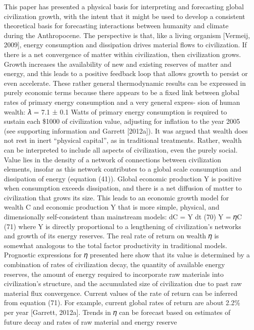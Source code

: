 \documentclass[
]{book}
\begin{document}
This paper has presented a physical basis for interpreting and forecasting global civilization growth, with
the intent that it might be used to develop a consistent theoretical basis for forecasting interactions
between humanity and climate during the Anthropocene.
The perspective is that, like a living organism {[}Vermeij, 2009{]}, energy consumption and dissipation drives
material ﬂows to civilization. If there is a net convergence of matter within civilization, then civilization
grows. Growth increases the availability of new and existing reserves of matter and energy, and this leads
to a positive feedback loop that allows growth to persist or even accelerate.
These rather general thermodynamic results can be expressed in purely economic terms because there
appears to be a ﬁxed link between global rates of primary energy consumption and a very general expres-
sion of human wealth: 𝜆 = 7.1 ± 0.1 Watts of primary energy consumption is required to sustain each
\$1000 of civilization value, adjusting for inﬂation to the year 2005 (see supporting information and Garrett
{[}2012a{]}).
It was argued that wealth does not rest in inert ``physical capital'', as in traditional treatments. Rather,
wealth can be interpreted to include all aspects of civilization, even the purely social. Value lies in the
density of a network of connections between civilization elements, insofar as this network contributes
to a global scale consumption and dissipation of energy (equation (41)). Global economic production Y is
positive when consumption exceeds dissipation, and there is a net diﬀusion of matter to civilization that
grows its size.
This leads to an economic growth model for wealth C and economic production Y that is more simple,
physical, and dimensionally self-consistent than mainstream models:
dC
= Y
dt (70)
Y = 𝜂C (71)
where Y is directly proportional to a lengthening of civilization's networks and growth of its energy
reserves. The real rate of return on wealth 𝜂 is somewhat analogous to the total factor productivity in
traditional models. Prognostic expressions for 𝜂 presented here show that its value is determined by a
combination of rates of civilization decay, the quantity of available energy reserves, the amount of energy
required to incorporate raw materials into civilization's structure, and the accumulated size of civilization
due to past raw material ﬂux convergence. Current values of the rate of return can be inferred from
equation (71). For example, current global rates of return are about 2.2\% per year {[}Garrett, 2012a{]}. Trends
in 𝜂 can be forecast based on estimates of future decay and rates of raw material and energy reserve
\end{document}
